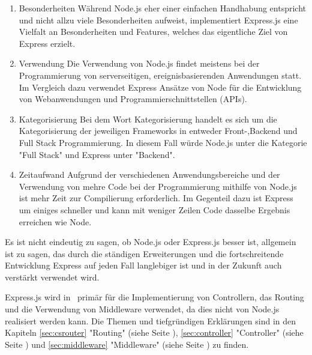 \begin{enumerate}
    \item Besonderheiten
    \newline
    Während Node.js eher einer einfachen Handhabung entspricht und nicht allzu viele Besonderheiten aufweist, implementiert Express.js eine Vielfalt an Besonderheiten und Features, welches das eigentliche Ziel von Express erzielt. \cite{NodeExp}
    \item Verwendung
    \newline
    Die Verwendung von Node.js findet meistens bei der Programmierung von serverseitigen, ereignisbasierenden Anwendungen statt. Im Vergleich dazu verwendet Express Ansätze von Node für die Entwicklung von Webanwendungen und Programmierschnittstellen (APIs). \cite{NodeExp}
    \item Kategorisierung
    \newline
    Bei dem Wort Kategorisierung handelt es sich um die Kategorisierung der jeweiligen Frameworks in entweder Front-,Backend und Full Stack Programmierung. In diesem Fall würde Node.js unter die Kategorie "Full Stack" und Express unter "Backend". \cite{NodeExp}
    \item Zeitaufwand
    \newline
    Aufgrund der verschiedenen Anwendungsbereiche und der Verwendung von mehre Code bei der Programmierung mithilfe von Node.js ist mehr Zeit zur Compilierung erforderlich. Im Gegenteil dazu ist Express um einiges schneller und kann mit weniger Zeilen Code dasselbe Ergebnis erreichen wie Node. \cite{NodeExp}
\end{enumerate} 

Es ist nicht eindeutig zu sagen, ob Node.js oder Express.js besser ist, allgemein ist zu sagen, das durch die ständigen Erweiterungen und die fortschreitende Entwicklung Express auf jeden Fall langlebiger ist und in der Zukunft auch verstärkt verwendet wird. \cite{NodeExp}

Express.js wird in \ZELIA\ primär für die Implementierung von Controllern, das Routing und die Verwendung von Middleware verwendet, da dies nicht von Node.js realisiert werden kann. Die Themen und tiefgründigen Erklärungen sind in den Kapiteln \ref{sec:csrouter} "Routing" (siehe Seite \pageref{sec:csrouter}), \ref{sec:controller} "Controller" (siehe Seite \pageref{sec:controller}) und \ref{sec:middleware} "Middleware" (siehe Seite \pageref{sec:middleware}) zu finden. \cite{NodeExp}
